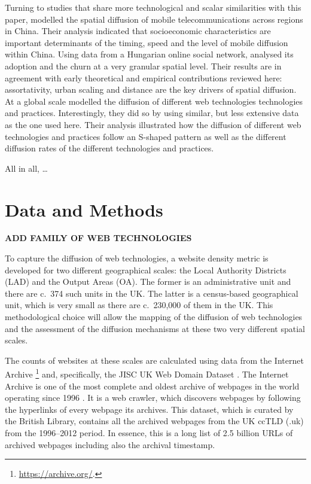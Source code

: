 \documentclass[
  authoryear,
  preprint,
  3p]{elsarticle}
\begin{document}
Turning to studies that share more technological and scalar similarities
with this paper, \citet{ding2010modeling} modelled the spatial diffusion
of mobile telecommunications across regions in China. Their analysis
indicated that socioeconomic characteristics are important determinants
of the timing, speed and the level of mobile diffusion within China.
Using data from a Hungarian online social network,
\citet{lengyel2020role} analysed its adoption and the churn at a very
granular spatial level. Their results are in agreement with early
theoretical and empirical contributions reviewed here: assortativity,
urban scaling and distance are the key drivers of spatial diffusion. At
a global scale \citet{PAPAGIANNIDIS2015308} modelled the diffusion of
different web technologies technologies and practices. Interestingly,
they did so by using similar, but less extensive data as the one used
here. Their analysis illustrated how the diffusion of different web
technologies and practices follow an S-shaped pattern as well as the
different diffusion rates of the different technologies and practices.

All in all, \ldots{}

\section{Data and Methods}\label{sec-datamethods}

\textbf{ADD FAMILY OF WEB TECHNOLOGIES}

To capture the diffusion of web technologies, a website density metric
is developed for two different geographical scales: the Local Authority
Districts (LAD) and the Output Areas (OA). The former is an
administrative unit and there are c.~374 such units in the UK. The
latter is a census-based geographical unit, which is very small as there
are c.~230,000 of them in the UK. This methodological choice will allow
the mapping of the diffusion of web technologies and the assessment of
the diffusion mechanisms at these two very different spatial scales.

The counts of websites at these scales are calculated using data from
the Internet Archive \footnote{\href{See\%20https://archive.org/}{https://archive.org/}.}
and, specifically, the JISC UK Web Domain Dataset \citep{ukwebarchive}.
The Internet Archive is one of the most complete and oldest archive of
webpages in the world operating since 1996
\citep{ainsworth2011much, holzmann2016dawn}. It is a web crawler, which
discovers webpages by following the hyperlinks of every webpage its
archives. This dataset, which is curated by the British Library,
contains all the archived webpages from the UK ccTLD (.uk) from the
1996--2012 period. In essence, this is a long list of 2.5 billion URLs
of archived webpages including also the archival timestamp.
\end{document}
